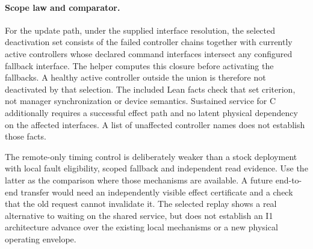 \documentclass{article}
\begin{document}
\paragraph{Scope law and comparator.}
For the update path, under the supplied interface resolution,
the selected deactivation set consists of the failed controller
chains together with currently active controllers whose declared
command interfaces intersect any configured fallback interface.
The helper computes this closure before activating the fallbacks.
A healthy active controller outside the union is therefore not
deactivated by that selection. The included Lean facts check
that set criterion, not manager synchronization or device
semantics. Sustained service for C additionally requires a
successful effect path and no latent physical dependency on
the affected interfaces. A list of unaffected controller names
does not establish those facts.

The remote-only timing control is deliberately weaker than a
stock deployment with local fault eligibility, scoped fallback
and independent read evidence. Use the latter as the comparison
where those mechanisms are available. A future end-to-end transfer
would need an independently visible effect certificate and a check
that the old request cannot invalidate it. The selected replay
shows a real alternative to waiting on the shared service, but
does not establish an I1 architecture advance over the existing
local mechanisms or a new physical operating envelope.
\end{document}
